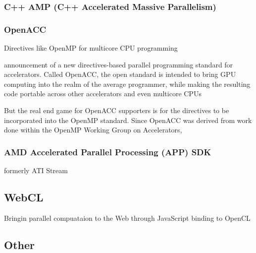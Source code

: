 \subsubsection{C++ AMP (C++ Accelerated Massive Parallelism)}


\subsubsection{OpenACC}
Directives like OpenMP for multicore CPU programming

announcement of a new directives-based parallel programming standard for accelerators.  Called OpenACC, the open standard is intended to bring GPU computing into the realm of the average programmer, while making the resulting code portable across other accelerators and even multicore CPUs

But the real end game for OpenACC supporters is for the directives to be incorporated into the OpenMP standard.  Since OpenACC was derived from work done within the OpenMP Working Group on Accelerators,

\subsubsection{AMD Accelerated Parallel Processing (APP) SDK}
formerly ATI Stream






\subsection{WebCL}
Bringin parallel compuataion to the Web through JavaScript binding to OpenCL

\subsection{Other}

